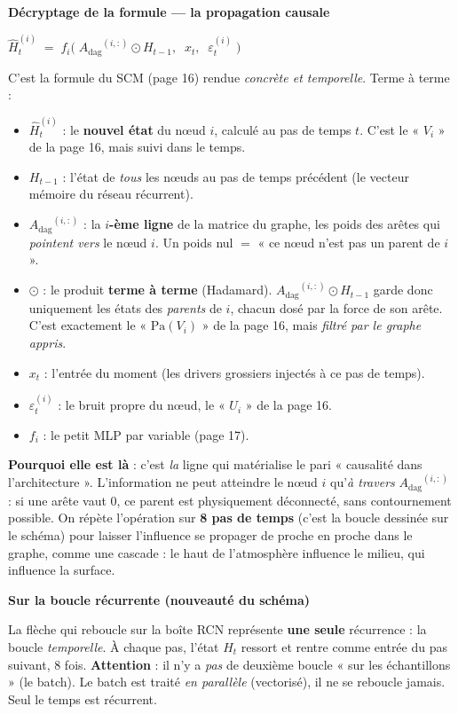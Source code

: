 \documentclass[11pt,a4paper]{article}
\newcommand{\Adag}{\ensuremath{A_{\mathrm{dag}}}}
\newcommand{\bloc}[1]{\par\medskip\noindent\textcolor{accent}{\textbf{#1}}\par\nopagebreak\smallskip}
\begin{document}
\bloc{Décryptage de la formule  --- la propagation causale}
\begin{formulebox}
\centering $\widehat{H}_t^{(i)} \;=\; f_i\!\Big(\;\Adag^{(i,:)} \odot H_{t-1},\;\; x_t,\;\; \varepsilon_t^{(i)}\;\Big)$
\end{formulebox}
C'est la formule du SCM (page 16) rendue \emph{concrète et temporelle}. Terme à terme :
\begin{itemize}[nosep]
  \item $\widehat{H}_t^{(i)}$ : le \textbf{nouvel état} du n\oe ud $i$, calculé au pas de temps $t$. C'est le « $V_i$ » de la page 16, mais suivi dans le temps.
  \item $H_{t-1}$ : l'état de \emph{tous} les n\oe uds au pas de temps précédent (le vecteur mémoire du réseau récurrent).
  \item $\Adag^{(i,:)}$ : la \textbf{$i$-ème ligne} de la matrice du graphe, les poids des arêtes qui \emph{pointent vers} le n\oe ud $i$. Un poids nul $=$ « ce n\oe ud n'est pas un parent de $i$ ».
  \item $\odot$ : le produit \textbf{terme à terme} (Hadamard). $\Adag^{(i,:)} \odot H_{t-1}$ garde donc uniquement les états des \emph{parents} de $i$, chacun dosé par la force de son arête. C'est exactement le « $\mathrm{Pa}(V_i)$ » de la page 16, mais \emph{filtré par le graphe appris}.
  \item $x_t$ : l'entrée du moment (les drivers grossiers injectés à ce pas de temps).
  \item $\varepsilon_t^{(i)}$ : le bruit propre du n\oe ud, le « $U_i$ » de la page 16.
  \item $f_i$ : le petit MLP par variable (page 17).
\end{itemize}
\textbf{Pourquoi elle est là} : c'est \emph{la} ligne qui matérialise le pari « causalité dans l'architecture ». L'information ne peut atteindre le n\oe ud $i$ qu'\emph{à travers} $\Adag^{(i,:)}$ : si une arête vaut 0, ce parent est physiquement déconnecté, sans contournement possible. On répète l'opération sur \textbf{8 pas de temps} (c'est la boucle dessinée sur le schéma) pour laisser l'influence se propager de proche en proche dans le graphe, comme une cascade : le haut de l'atmosphère influence le milieu, qui influence la surface.

\bloc{Sur la boucle récurrente (nouveauté du schéma)}
La flèche qui reboucle sur la boîte RCN représente \textbf{une seule} récurrence : la boucle \emph{temporelle}. À chaque pas, l'état $H_t$ ressort et rentre comme entrée du pas suivant, 8 fois. \textbf{Attention} : il n'y a \emph{pas} de deuxième boucle « sur les échantillons » (le batch). Le batch est traité \emph{en parallèle} (vectorisé), il ne se reboucle jamais. Seul le temps est récurrent.
\end{document}
